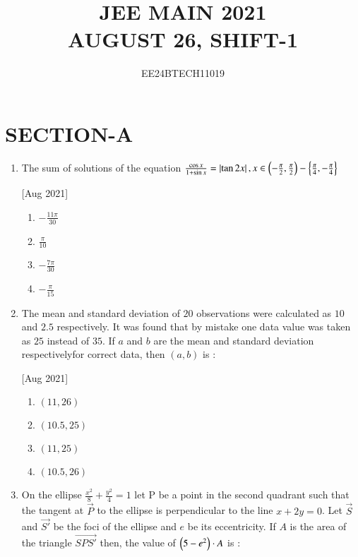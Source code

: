 \documentclass[journal,12pt,twocolumn]{IEEEtran}
\theoremstyle{remark}
\begin{document}

\vspace{3cm}

\title{\textbf{JEE MAIN 2021\\AUGUST 26, SHIFT-1}}
\author{EE24BTECH11019}
\maketitle
\newpage
\bigskip

\renewcommand{\thefigure}{\theenumi}
\renewcommand{\thetable}{\theenumi}

\section*{\textbf{SECTION-A}}
\bigskip

\begin{enumerate}
    \item The sum of solutions of the equation $\frac{\cos{x}}{1+\sin{x}}=\left\vert\tan{2x}\right\vert, x \in \left(-\frac{\pi}{2},\frac{\pi}{2}\right)-\left\{\frac{\pi}{4},-\frac{\pi}{4}\right\}$
    
    \hfill[Aug 2021]
        \begin{enumerate}
            \item $-\frac{11\pi}{30}$
            \item $\frac{\pi}{10}$
            \item $-\frac{7\pi}{30}$
            \item $-\frac{\pi}{15}$
        \end{enumerate}
    
    \item The mean and standard deviation of $20$ observations were calculated as $10$ and $2.5$ respectively. It was found that by mistake one data value was taken as $25$ instead of $35$. If $a$ and $b$ are the mean and standard deviation respectivelyfor correct data, then $(a,b)$ is :
    
    \hfill[Aug 2021]
        \begin{enumerate}
            \item $(11,26)$
            \item $(10.5,25)$
            \item $(11,25)$
            \item $(10.5,26)$
        \end{enumerate}
    
    \item On the ellipse $\frac{x^2}{8}+\frac{y^2}{4}=1$ let P be a point in the second quadrant such that the tangent at $\vec{P}$ to the ellipse is perpendicular to the line $x+2y=0$. Let $\vec{S}$ and $\vec{S'}$ be the foci of the ellipse and $e$ be its eccentricity. If $A$ is the area of the triangle $\vec{SPS'}$ then, the value of $\left(5-e^2\right)\cdot A$ is :
    

\end{enumerate}
\end{document}
